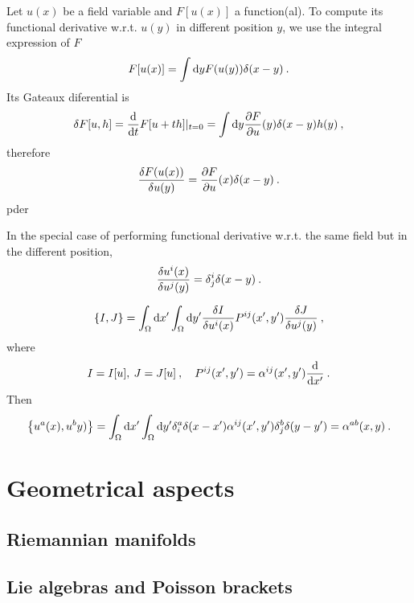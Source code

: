 \begin{example}
    Let $u(x)$ be a field variable and $F[u(x)]$ a function(al). 
    To compute its functional derivative w.r.t. $u(y)$ in different position $y$, we use the integral expression of $F$
    \begin{align}
        F[u(x)] = \int \mathrm{d} y F(u(y)) \delta (x-y) \:.
    \end{align}
    Its Gateaux diferential is
    \begin{align}
        \delta F[u,h] = \frac{\mathrm{d}}{\mathrm{d}t} F[u+th]|_{t=0} = \int \mathrm{d} y \frac{\partial F}{\partial u}(y) \delta(x-y) h(y) \:,
    \end{align}
    therefore
    \begin{align}
        \frac{\delta F(u(x))}{\delta u(y)} = \frac{\partial F}{\partial u}(x) \delta(x-y) \:.
    \end{align}pder{}{} 
\end{example}

\begin{example}
    In the special case of performing functional derivative w.r.t. the same field but in the different position,
    \begin{align}
        \frac{\delta u^i(x)}{\delta u^j(y)} = \delta^i_j \delta(x-y) \:.   
    \end{align}
\end{example}

\begin{example}
    \begin{align}
        \left \lbrace I,J \right \rbrace = \int_\Omega \mathrm{d} x' \int_\Omega \mathrm{d} y' \frac{\delta I}{\delta u^i(x)} P^{ij}(x',y') \frac{\delta J}{\delta u^j(y)} \:,
    \end{align}
    where
    \begin{align}
        I = I[u], \: J = J[u] \:, \quad P^{ij}(x',y') = \alpha^{ij}(x',y') \frac{\mathrm{d}}{\mathrm{d}x'} \:.
    \end{align}
    Then
    \begin{align}
        \left \lbrace u^a(x),u^b y) \right \rbrace = \int_\Omega \mathrm{d} x' \int_\Omega \mathrm{d} y' \delta^a_i \delta(x-x') \alpha^{ij}(x',y') \delta^b_j \delta(y-y') = \alpha^{ab}(x,y) \:.
    \end{align}
\end{example}


\section{Geometrical aspects}
\subsection{Riemannian manifolds}
\subsection{Lie algebras and Poisson brackets}

